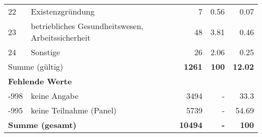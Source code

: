 \begin{longtable}{lXrrr}
        22 & \multicolumn{1}{X}{Existenzgründung} & %
          \num{7} &
          \num[round-mode=places,round-precision=2]{0.56} &
          \num[round-mode=places,round-precision=2]{0.07} \\

        23 & \multicolumn{1}{X}{betriebliches Gesundheitswesen, Arbeitssicherheit} & %
          \num{48} &
          \num[round-mode=places,round-precision=2]{3.81} &
          \num[round-mode=places,round-precision=2]{0.46} \\

        24 & \multicolumn{1}{X}{Sonstige} & %
          \num{26} &
          \num[round-mode=places,round-precision=2]{2.06} &
          \num[round-mode=places,round-precision=2]{0.25} \\

     \midrule
     \multicolumn{2}{l}{Summe (gültig)} &
       \textbf{\num{1261}} &
     \textbf{\num{100}} &
       \textbf{\num[round-mode=places,round-precision=2]{12.02}} \\
     \multicolumn{5}{l}{\textbf{Fehlende Werte}}\\
       -998 &
       keine Angabe &
         \num{3494} &
        - &
         \num[round-mode=places,round-precision=2]{33.3} \\
       -995 &
       keine Teilnahme (Panel) &
         \num{5739} &
        - &
         \num[round-mode=places,round-precision=2]{54.69} \\
     \midrule
     \multicolumn{2}{l}{\textbf{Summe (gesamt)}} &
          \textbf{\num{10494}} &
        \textbf{-} &
        \textbf{\num{100}} \\
     \bottomrule
     \end{longtable}
     
